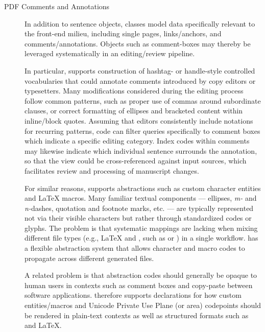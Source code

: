 \documentclass[11pt]{article}
\begin{document}
{{\begin{description}
\item[PDF Comments and Annotations]  In addition to sentence 
objects, \PacTk{} classes model data specifically relevant to 
the \PDF{} front-end milieu, including single pages, links/anchors, and 
comments/annotations.  Objects such as comment-boxes 
may thereby be leveraged systematically in an editing/review pipeline.

\pseudoIndent{} In particular, \PacTk{} supports construction of hashtag- or handle-style 
controlled vocabularies that could annotate \PDF{} comments 
introduced by copy editors or typesetters.  Many modifications considered 
during the editing process follow common patterns, such as 
proper use of commas around subordinate clauses, or correct formatting 
of ellipses and bracketed content within inline/block quotes.  Assuming 
that editors consistently include notations for recurring patterns, 
\PacTk{} code can filter queries specifically to \PDF{} comment 
boxes which indicate a specific editing category.  Index codes within 
\PDF{} comments may likewise indicate which individual sentence 
surrounds the annotation, so that the \PDF{} view could be cross-referenced 
against input sources, which facilitates review and processing 
of manuscript changes.


\pseudoIndent{} For similar reasons, \PacTk{} supports abstractions 
such as \XML{} custom character entities and \LaTeX{} macros.  
Many familiar textual components --- ellipses, 
\textit{m-} and \textit{n-}dashes, 
quotation and footnote marks, etc. --- are typically represented 
not via their visible characters but rather through standardized 
codes or glyphs.  The problem is that systematic mappings 
are lacking when mixing different file types (e.g., \LaTeX{} and 
\XML{}, such as \JATS{} or \BITS{}) in a single workflow.  
\lPacTk{} has a flexible abstraction system that allows 
character and macro codes to propagate across different 
generated files.


\pseudoIndent{} A related problem is that abstraction codes should 
generally be opaque to human users in contexts such as 
comment boxes and copy-paste between software applications.  
\lPacTk{} therefore supports declarations for how 
custom entities/macros and Unicode Private Use Plane 
(or area) codepoints 
should be rendered in plain-text contexts as well as 
structured formats such as \XML{} and \LaTeX{}.        
 
\end{description}
}



}
\end{document}
